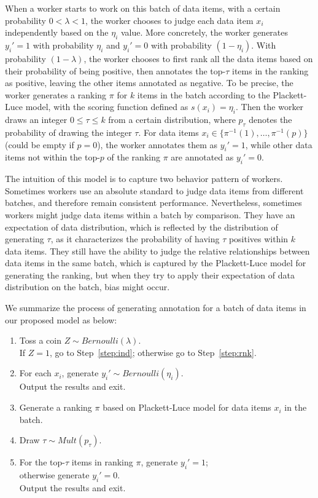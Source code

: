 When a worker starts to work on this batch of data items, 
with a certain probability $0 < \lambda < 1$, 
the worker chooses to judge each data item $x_i$ independently based on the $\eta_i$ value.  
More concretely, the worker generates $y_i' = 1$ with probability $\eta_i$ and $y_i' = 0$ with probability $(1 - \eta_i)$.  
With probability $(1 - \lambda)$, the worker chooses to first rank all the data items based on their probability of being positive, 
then annotates the top-$\tau$ items in the ranking as positive, leaving the other items annotated as negative.  
To be precise, the worker generates a ranking $\pi$ for $k$ items in the batch according to the Plackett-Luce model, 
with the scoring function defined as $s(x_i) = \eta_i$.  
Then the worker draws an integer $0 \leq \tau \leq k$ from a certain distribution, 
where $p_\tau$ denotes the probability of drawing the integer $\tau$.    
For data items $x_i \in \{\pi^{-1}(1), \ldots, \pi^{-1}(p)\}$ (could be empty if $p = 0$), the worker annotates them as $y_i'=1$, 
while other data items not within the top-$p$ of the ranking $\pi$ are annotated as $y_i' = 0$.

The intuition of this model is to capture two behavior pattern of workers.  
Sometimes workers use an absolute standard to judge data items from different batches, 
and therefore remain consistent performance.  
Nevertheless, sometimes workers might judge data items within a batch by comparison.  
They have an expectation of data distribution, 
which is reflected by the distribution of generating $\tau$, 
as it characterizes the probability of having $\tau$ positives within $k$ data items.   
They still have the ability to judge the relative relationships between data items in the same batch,
which is captured by the Plackett-Luce model for generating the ranking, 
but when they try to apply their expectation of data distribution on the batch, 
bias might occur.  

We summarize the process of generating annotation for a batch of data items in our proposed model as below:
\begin{enumerate}
  \item \label{step:tosscoin}
        Toss a coin $Z \sim Bernoulli(\lambda)$.  \\
        If $Z=1$, go to Step~\ref{step:ind};
        otherwise go to Step~\ref{step:rnk}.
  \item \label{step:ind}
        For each $x_i$, generate $y_i' \sim Bernoulli(\eta_i)$. \\
        Output the results and exit.  
  \item \label{step:rnk}
        Generate a ranking $\pi$ based on Plackett-Luce model for data items $x_i$ in the batch.
  \item \label{step:draw}
        Draw $\tau \sim Mult(p_{\tau})$.
  \item \label{step:annotate}
        For the top-$\tau$ items in ranking $\pi$, generate $y_i' = 1$; \\
        otherwise generate $y_i' = 0$.  \\
        Output the results and exit.  
\end{enumerate}



